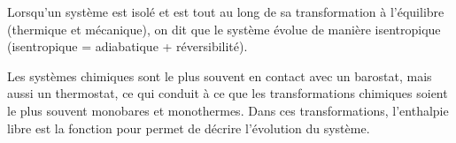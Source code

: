 
Lorsqu'un système est isolé et est tout au long de sa transformation à l'équilibre (thermique et mécanique), on dit que le système évolue de manière isentropique (isentropique = adiabatique + réversibilité).

Les systèmes chimiques sont le plus souvent en contact avec un barostat, mais aussi un thermostat, ce qui conduit à ce que les transformations chimiques soient le plus souvent monobares et monothermes. Dans ces transformations, l'enthalpie libre est la fonction pour permet de décrire l'évolution du système.



